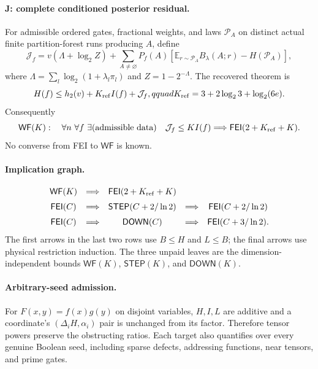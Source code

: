 \paragraph{J: complete conditioned posterior residual.}
For admissible ordered gates, fractional weights, and laws $\mathcal P_A$ on
distinct actual finite partition-forest runs producing $A$, define
\[
 \mathcal J_f=
 v(\Lambda+\log_2Z)+\sum_{A\ne\varnothing}P_f(A)
 \left[\mathbb E_{r\sim\mathcal P_A}B_\lambda(A;r)-H(\mathcal P_A)\right],
\]
where $\Lambda=\sum_l\log_2(1+\lambda_l\pi_l)$ and $Z=1-2^{-\Lambda}$.
The recovered theorem is
\[
 H(f)\le h_2(v)+K_{\rm ref}I(f)+\mathcal J_f,qquad
 K_{\rm ref}=3+2\log_2 3+\log_2(6e).
\]
Consequently
\[
 \mathsf{WF}(K):\quad \forall n\ \forall f\ \exists
 (\text{admissible data})\quad \mathcal J_f\le KI(f)
 \Longrightarrow \mathsf{FEI}(2+K_{\rm ref}+K).
\]
No converse from FEI to $\mathsf{WF}$ is known.

\paragraph{Implication graph.}
\[
 \begin{array}{ccccc}
 \mathsf{WF}(K)&\Longrightarrow&\mathsf{FEI}(2+K_{\rm ref}+K)\\[2mm]
 \mathsf{FEI}(C)&\Longrightarrow&\mathsf{STEP}(C+2/\ln2)&\Longrightarrow&
 \mathsf{FEI}(C+2/\ln2)\\[2mm]
 \mathsf{FEI}(C)&\Longrightarrow&\mathsf{DOWN}(C)&\Longrightarrow&
 \mathsf{FEI}(C+3/\ln2).
 \end{array}
\]
The first arrows in the last two rows use $B\le H$ and $L\le B$; the final
arrows use physical restriction induction. The three unpaid leaves are the
dimension-independent bounds $\mathsf{WF}(K)$, $\mathsf{STEP}(K)$, and
$\mathsf{DOWN}(K)$.

\paragraph{Arbitrary-seed admission.}
For $F(x,y)=f(x)g(y)$ on disjoint variables, $H,I,L$ are additive and a
coordinate's $(\Delta_iH,\alpha_i)$ pair is unchanged from its factor.
Therefore tensor powers preserve the obstructing ratios. Each target also
quantifies over every genuine Boolean seed, including sparse defects,
addressing functions, near tensors, and prime gates.
